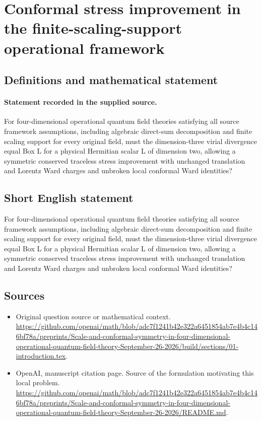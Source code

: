 \documentclass[11pt]{article}
\begin{document}
\section*{Conformal stress improvement in the finite-scaling-support operational framework}\label{30007240}
\subsection{Definitions and mathematical statement}
\paragraph{Statement recorded in the supplied source.}
For four-dimensional operational quantum field theories satisfying all source framework assumptions, including algebraic direct-sum decomposition and finite scaling support for every original field, must the dimension-three virial divergence equal Box L for a physical Hermitian scalar L of dimension two, allowing a symmetric conserved traceless stress improvement with unchanged translation and Lorentz Ward charges and unbroken local conformal Ward identities?
\subsection{Short English statement}
For four-dimensional operational quantum field theories satisfying all source framework assumptions, including algebraic direct-sum decomposition and finite scaling support for every original field, must the dimension-three virial divergence equal Box L for a physical Hermitian scalar L of dimension two, allowing a symmetric conserved traceless stress improvement with unchanged translation and Lorentz Ward charges and unbroken local conformal Ward identities?
\subsection{Sources}
\begin{itemize}
\item[S1] Original question source or mathematical context.
\url{https://github.com/openai/math/blob/adc7f1241b42e322a6451854ab7e4b4c146bf78a/preprints/Scale-and-conformal-symmetry-in-four-dimensional-operational-quantum-field-theory-September-26-2026/build/sections/01-introduction.tex}.
\item[S2] OpenAI, manuscript citation page. Source of the formulation motivating this local problem.
\url{https://github.com/openai/math/blob/adc7f1241b42e322a6451854ab7e4b4c146bf78a/preprints/Scale-and-conformal-symmetry-in-four-dimensional-operational-quantum-field-theory-September-26-2026/README.md}.
\end{itemize}
\end{document}
